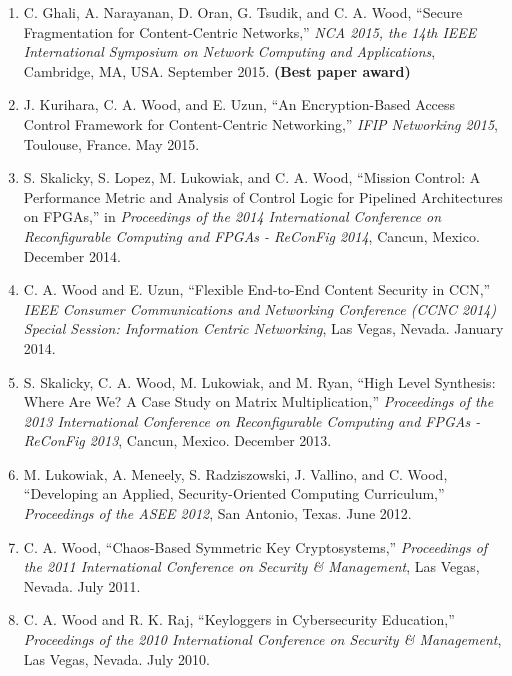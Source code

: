 \documentclass[10pt]{res} %
\begin{document}
\begin{resume}
\begin{enumerate}[C-1.]
\item C. Ghali, A. Narayanan, D. Oran, G. Tsudik, and C. A. Wood, ``Secure Fragmentation for Content-Centric Networks,'' \emph{NCA 2015, the 14th IEEE International Symposium on Network Computing and Applications}, Cambridge, MA, USA. September 2015. {\color{red} {\bf (Best paper award)}}

\item J. Kurihara, C. A. Wood, and E. Uzun, ``An Encryption-Based Access Control Framework for Content-Centric Networking,'' \emph{IFIP Networking 2015}, Toulouse, France. May 2015.

\item S. Skalicky, S. Lopez, M. Lukowiak, and C. A. Wood, ``Mission Control: A Performance Metric and Analysis of Control Logic for Pipelined Architectures on FPGAs,'' in {\it Proceedings of the 2014 International Conference on Reconfigurable Computing and FPGAs - ReConFig 2014}, Cancun, Mexico. December 2014.

\item C. A. Wood and E. Uzun, ``Flexible End-to-End Content Security in CCN,'' \emph{IEEE Consumer Communications and Networking Conference (CCNC 2014) Special Session: Information Centric Networking}, Las Vegas, Nevada. January 2014.

\item S. Skalicky, C. A. Wood, M. Lukowiak, and M. Ryan, ``High Level Synthesis: Where Are We? A Case Study on Matrix Multiplication,'' \emph{Proceedings of the 2013 International Conference on Reconfigurable Computing and FPGAs - ReConFig 2013}, Cancun, Mexico. December 2013.

\item M. Lukowiak, A. Meneely, S. Radziszowski, J. Vallino, and C. Wood, ``Developing an Applied, Security-Oriented Computing Curriculum,'' \emph{Proceedings of the ASEE 2012}, San Antonio, Texas. June 2012.

\item C. A. Wood, ``Chaos-Based Symmetric Key Cryptosystems,'' \emph{Proceedings of the 2011 International Conference on Security \& Management}, Las Vegas, Nevada. July 2011.

\item C. A. Wood and R. K. Raj, ``Keyloggers in Cybersecurity Education,'' \emph{Proceedings of the 2010 International Conference on Security \& Management}, Las Vegas, Nevada. July 2010.

\end{enumerate}


\end{resume}
\end{document}
